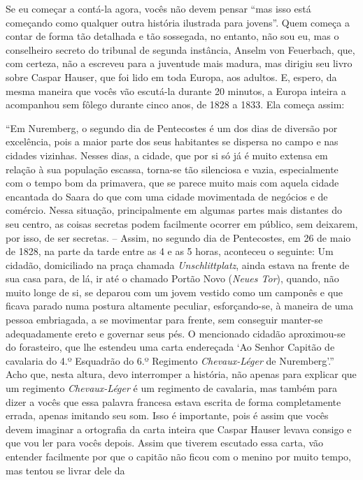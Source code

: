 Se eu começar a contá-la agora, vocês não devem pensar ``mas isso está
começando como qualquer outra história ilustrada para jovens''. Quem
começa a contar de forma tão detalhada e tão sossegada, no entanto, não
sou eu, mas o conselheiro secreto do tribunal de segunda instância,
Anselm von Feuerbach, que, com certeza, não a escreveu para a juventude
mais madura, mas dirigiu seu livro sobre Caspar Hauser, que
foi lido em toda Europa, aos adultos. E, espero, da mesma maneira que vocês vão
escutá-la durante 20 minutos, a Europa inteira a acompanhou sem fôlego
durante cinco anos, de 1828 a 1833. Ela começa assim:

``Em Nuremberg, o segundo dia de Pentecostes é um dos dias de diversão
por excelência, pois a maior parte dos seus habitantes se dispersa no
campo e nas cidades vizinhas. Nesses dias, a cidade, que por si só já é
muito extensa em relação à sua população escassa, torna-se tão
silenciosa e vazia, especialmente com o tempo bom da primavera, que se
parece muito mais com aquela cidade encantada do Saara do que com uma
cidade movimentada de negócios e de comércio. Nessa situação,
principalmente em algumas partes mais distantes do seu centro, as coisas
secretas podem facilmente ocorrer em público, sem deixarem, por isso, de
ser secretas. -- Assim, no segundo dia de Pentecostes, em 26 de maio de
1828, na parte da tarde entre as 4 e as 5 horas, aconteceu o seguinte:
Um cidadão, domiciliado na praça chamada \emph{Unschlittplatz}, ainda
estava na frente de sua casa para, de lá, ir até o chamado Portão Novo
(\emph{Neues Tor}), quando, não muito longe de si, se deparou com um
jovem vestido como um camponês e que ficava parado numa postura
altamente peculiar, esforçando-se, à maneira de uma pessoa embriagada, a
se movimentar para frente, sem conseguir manter-se adequadamente ereto e
governar seus pés. O mencionado cidadão aproximou-se do forasteiro, que
lhe estendeu uma carta endereçada `Ao Senhor Capitão de cavalaria do 4.º
Esquadrão do 6.º Regimento \emph{Chevaux-Léger} de Nuremberg'.'' Acho
que, nesta altura, devo interromper a história, não apenas para explicar
que um regimento \emph{Chevaux-Léger} é um regimento de cavalaria, mas
também para dizer a vocês que essa palavra francesa estava escrita de
forma completamente errada, apenas imitando seu som. Isso é importante,
pois é assim que vocês devem imaginar a ortografia da carta inteira que
Caspar Hauser levava consigo e que vou ler para vocês depois. Assim que
tiverem escutado essa carta, vão entender facilmente por que o capitão
não ficou com o menino por muito tempo, mas tentou se livrar dele da

